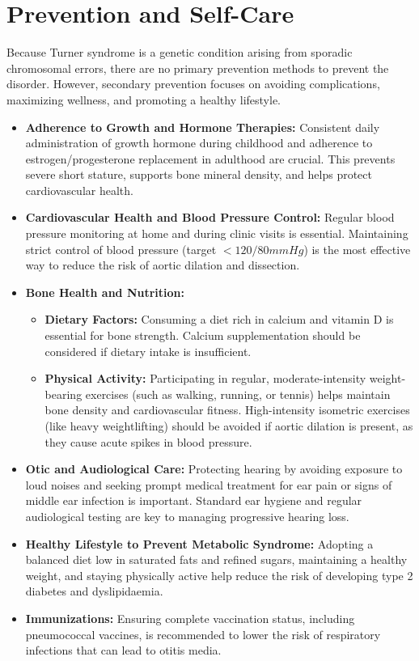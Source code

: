 \section*{Prevention and Self-Care}
Because Turner syndrome is a genetic condition arising from sporadic chromosomal errors, there are no primary prevention methods to prevent the disorder. However, secondary prevention focuses on avoiding complications, maximizing wellness, and promoting a healthy lifestyle.
\begin{itemize}
    \item \textbf{Adherence to Growth and Hormone Therapies:} Consistent daily administration of growth hormone during childhood and adherence to estrogen/progesterone replacement in adulthood are crucial. This prevents severe short stature, supports bone mineral density, and helps protect cardiovascular health.
    \item \textbf{Cardiovascular Health and Blood Pressure Control:} Regular blood pressure monitoring at home and during clinic visits is essential. Maintaining strict control of blood pressure (target $< 120/80 mmHg$) is the most effective way to reduce the risk of aortic dilation and dissection.
    \item \textbf{Bone Health and Nutrition:}
    \begin{itemize}
        \item \textbf{Dietary Factors:} Consuming a diet rich in calcium and vitamin D is essential for bone strength. Calcium supplementation should be considered if dietary intake is insufficient.
        \item \textbf{Physical Activity:} Participating in regular, moderate-intensity weight-bearing exercises (such as walking, running, or tennis) helps maintain bone density and cardiovascular fitness. High-intensity isometric exercises (like heavy weightlifting) should be avoided if aortic dilation is present, as they cause acute spikes in blood pressure.
    \end{itemize}
    \item \textbf{Otic and Audiological Care:} Protecting hearing by avoiding exposure to loud noises and seeking prompt medical treatment for ear pain or signs of middle ear infection is important. Standard ear hygiene and regular audiological testing are key to managing progressive hearing loss.
    \item \textbf{Healthy Lifestyle to Prevent Metabolic Syndrome:} Adopting a balanced diet low in saturated fats and refined sugars, maintaining a healthy weight, and staying physically active help reduce the risk of developing type 2 diabetes and dyslipidaemia.
    \item \textbf{Immunizations:} Ensuring complete vaccination status, including pneumococcal vaccines, is recommended to lower the risk of respiratory infections that can lead to otitis media.
\end{itemize}

